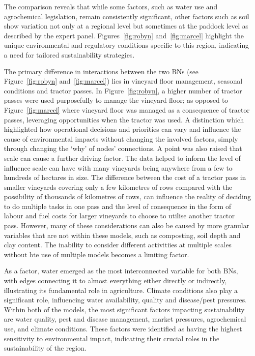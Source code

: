 \documentclass[fleqn,10pt]{wlscirep}
\begin{document}
The comparison reveals that while some factors, such as water use and agrochemical legislation, remain consistently significant, other factors such as soil show variation not only at a regional level but sometimes at the paddock level as described by the expert panel. Figures~\ref{fig:robyn} and~\ref{fig:marcel} highlight the unique environmental and regulatory conditions specific to this region, indicating a need for tailored sustainability strategies.

The primary difference in interactions between the two BNs (see Figure~\ref{fig:robyn} and~\ref{fig:marcel}) lies in vineyard floor management, seasonal conditions and tractor passes. In Figure~\ref{fig:robyn}, a higher number of tractor passes were used purposefully to manage the vineyard floor; as opposed to Figure~\ref{fig:marcel} where vineyard floor was managed as a consequence of tractor passes, leveraging opportunities when the tractor was used. A distinction which highlighted how operational decisions and priorities can vary and influence the cause of environmental impacts without changing the involved factors, simply through changing the `why' of nodes' connections. A point was also raised that scale can cause a further driving factor. The data helped to inform the level of influence scale can have with many vineyards being anywhere from a few to hundreds of hectares in size. The difference between the cost of a tractor pass in smaller vineyards covering only a few kilometres of rows compared with the possibility of thousands of kilometres of rows, can influence the reality of deciding to do multiple tasks in one pass and the level of consequence in the form of labour and fuel costs for larger vineyards to choose to utilise another tractor pass. However, many of these considerations can also be caused by more granular variables that are not within these models, such as composting, soil depth and clay content. The inability to consider different activitiies at multiple scales without hte use of multiple models becomes a limiting factor.


As a factor, water emerged as the most interconnected variable for both BNs, with edges connecting it to almost everything either directly or indirectly, illustrating its fundamental role in agriculture. Climate conditions also play a significant role, influencing water availability, quality and disease/pest pressures. Within both of the models, the most significant factors impacting sustainability are water quality, pest and disease management, market pressures, agrochemical use, and climate conditions. These factors were identified as having the highest sensitivity to environmental impact, indicating their crucial roles in the sustainability of the region.
\end{document}
